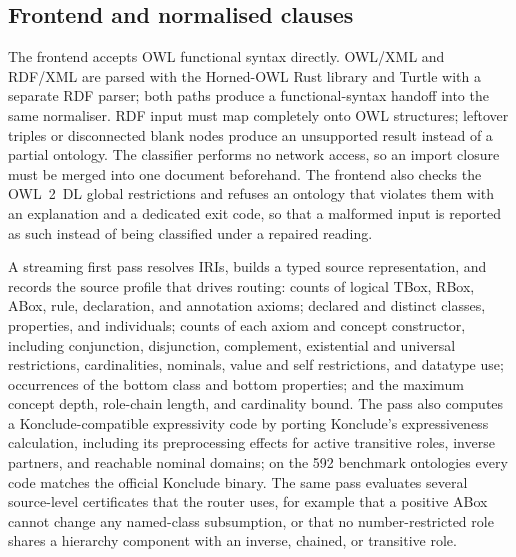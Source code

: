 \subsection{Frontend and normalised clauses}
\label{sec:frontend}

The frontend accepts OWL functional syntax directly.  OWL/XML and RDF/XML are
parsed with the Horned-OWL Rust library \cite{lord2024horned} and Turtle with a
separate RDF parser; both paths produce a functional-syntax handoff into the
same normaliser.  RDF input must map completely onto OWL structures; leftover
triples or disconnected blank nodes produce an unsupported result instead of a
partial ontology.  The classifier performs no network access, so an import
closure must be merged into one document beforehand.  The frontend
also checks the OWL~2~DL global restrictions and refuses an ontology that
violates them with an explanation and a dedicated exit code, so that a
malformed input is reported as such instead of being classified under a
repaired reading.

A streaming first pass resolves IRIs, builds a typed source representation,
and records the source profile that drives routing: counts of logical TBox,
RBox, ABox, rule, declaration, and annotation axioms; declared and distinct
classes, properties, and individuals; counts of each axiom and concept
constructor, including conjunction, disjunction, complement, existential and
universal restrictions, cardinalities, nominals, value and self restrictions,
and datatype use; occurrences of the bottom class and bottom properties; and
the maximum concept depth, role-chain length, and cardinality bound.  The pass
also computes a Konclude-compatible expressivity code by porting Konclude's
expressiveness calculation, including its preprocessing effects for active
transitive roles, inverse partners, and reachable nominal domains; on the 592
benchmark ontologies every code matches the official Konclude binary.  The same
pass evaluates several source-level certificates that the router uses, for
example that a positive ABox cannot change any named-class subsumption, or
that no number-restricted role shares a hierarchy component with an inverse,
chained, or transitive role.

